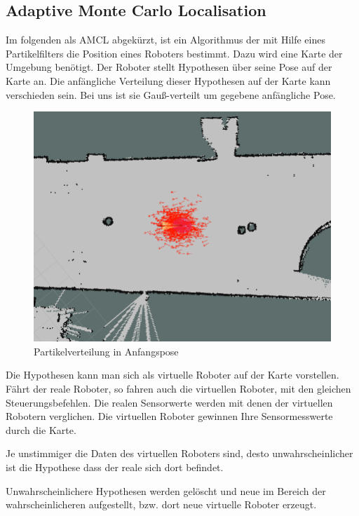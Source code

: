 \documentclass[11pt,a4paper]{article}
\begin{document}
{{	}
\subsection{Adaptive  Monte Carlo Localisation \cite{mclWiki}}
Im folgenden als AMCL abgek\"urzt, ist ein Algorithmus der mit Hilfe eines Partikelfilters die Position eines Roboters bestimmt. Dazu wird eine Karte der Umgebung ben\"otigt. Der Roboter stellt Hypothesen \"uber seine Pose auf der Karte an. Die anf\"angliche Verteilung dieser Hypothesen auf der Karte kann verschieden sein. 
Bei uns ist sie Gau{\ss}-verteilt um gegebene anfängliche Pose. 

\begin{figure}[h]
	\includegraphics[width=\linewidth]{pictures/initial_distribution.jpg}
	\caption{Partikelverteilung in Anfangspose}
\end{figure}

Die Hypothesen kann man sich als virtuelle Roboter auf der Karte vorstellen. Fährt der reale Roboter, so fahren auch die virtuellen Roboter, mit den gleichen Steuerungsbefehlen. Die realen Sensorwerte werden mit denen der virtuellen Robotern verglichen. Die virtuellen Roboter gewinnen Ihre Sensormesswerte durch die Karte.

Je unstimmiger die Daten des virtuellen Roboters sind, desto unwahrscheinlicher ist die Hypothese dass der reale sich dort befindet. 

Unwahrscheinlichere Hypothesen werden gelöscht und neue im Bereich der wahrscheinlicheren aufgestellt, bzw. dort neue virtuelle Roboter erzeugt.

}
\end{document}
